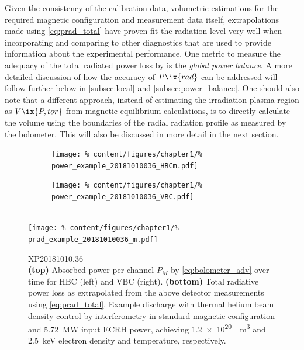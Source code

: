 %
            Given the consistency of the calibration data, volumetric estimations for the required magnetic configuration and measurement data itself, extrapolations made using \cref{eq:prad_total} have proven fit the radiation level very well when incorporating and comparing to other diagnostics that are used to provide information about the experimental performance. One metric to measure the adequacy of the total radiated power loss by is the \textit{global power balance}. A more detailed discussion of how the accuracy of $P\ix{rad}$ can be addressed will follow further below in \cref{subsec:local} and \cref{subsec:power_balance}. One should also note that a different approach, instead of estimating the irradiation plasma region as $V\ix{P, tor}$ from magnetic equilibrium calculations, is to directly calculate the volume using the boundaries of the radial radiation profile as measured by the bolometer. This will also be discussed in more detail in the next section.%
%
            \begin{figure}[t]%
                \centering%
                \begin{subfigure}{0.47\textwidth}%
                    \texttt{[image: \%
                        content/figures/chapter1/\%
                        power\_example\_20181010036\_HBCm.pdf]}%
                \end{subfigure}%
                \begin{subfigure}{0.47\textwidth}%
                    \texttt{[image: \%
                        content/figures/chapter1/\%
                        power\_example\_20181010036\_VBC.pdf]}%
                \end{subfigure}\\%
                \hspace*{-0.4cm}%
                \texttt{[image: \%
                    content/figures/chapter1/\%
                    prad\_example\_20181010036\_m.pdf]}%
                \caption{%
                    XP20181010.36\\%
                    \textbf{(top)} Absorbed power per channel $P_{M}$ by \cref{eq:bolometer_adv} over time for HBC (left) and VBC (right). \textbf{(bottom)} Total radiative power loss as extrapolated from the above detector measurements using \cref{eq:prad_total}. Example discharge with thermal helium beam density control by interferometry in standard magnetic configuration and \SI{5.72}{\mega\watt} input ECRH power, achieving \SI{1.2e20}{\per\cubic\meter} and \SI{2.5}{\kilo\electronvolt} electron density and temperature, respectively.}\label{fig:power_prad_ex}%
            \end{figure}%
%
